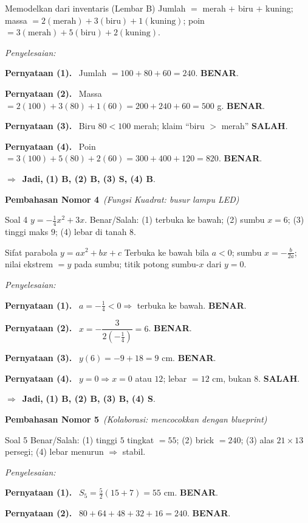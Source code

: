 \documentclass[11pt,a4paper]{article}
\newcommand{\jawab}{\par\smallskip\noindent\textit{\textcolor{oranye}{Penyelesaian:}}\par\smallskip}
\newcommand{\jadi}{\par\smallskip\noindent$\Rightarrow$\ \textbf{Jadi, }}
\newcommand{\benar}{\textbf{\textcolor{hijau}{BENAR}}}
\newcommand{\salah}{\textbf{\textcolor{merah}{SALAH}}}
\newcommand{\pernyataan}[1]{\par\smallskip\noindent\textbf{Pernyataan (#1).}\ }
\newcommand{\nomorjudul}[2]{\par\bigskip\noindent%
  {\large\bfseries\color{ungu}Pembahasan Nomor #1}\ {\normalfont\itshape\color{gray}(#2)}\par\nopagebreak\smallskip}
\begin{document}
\begin{ingat}{Memodelkan dari inventaris (Lembar B)}
Jumlah $=$ merah $+$ biru $+$ kuning; massa $=2(\text{merah})+3(\text{biru})+1(\text{kuning})$;
poin $=3(\text{merah})+5(\text{biru})+2(\text{kuning})$.
\end{ingat}

\jawab
\pernyataan{1} Jumlah $=100+80+60=240$. \benar.

\pernyataan{2} Massa $=2(100)+3(80)+1(60)=200+240+60=500$ g. \benar.

\pernyataan{3} Biru $80<100$ merah; klaim ``biru $>$ merah'' \salah.

\pernyataan{4} Poin $=3(100)+5(80)+2(60)=300+400+120=820$. \benar.

\jadi \textbf{(1) B, (2) B, (3) S, (4) B}.

\nomorjudul{4}{Fungsi Kuadrat: busur lampu LED}
\begin{soalbox}{Soal 4}
$y=-\tfrac14x^2+3x$. Benar/Salah: (1) terbuka ke bawah; (2) sumbu $x=6$;
(3) tinggi maks $9$; (4) lebar di tanah $8$.
\end{soalbox}

\begin{ingat}{Sifat parabola $y=ax^2+bx+c$}
Terbuka ke bawah bila $a<0$; sumbu $x=-\tfrac{b}{2a}$; nilai ekstrem $=y$ pada
sumbu; titik potong sumbu-$x$ dari $y=0$.
\end{ingat}

\jawab
\pernyataan{1} $a=-\tfrac14<0\Rightarrow$ terbuka ke bawah. \benar.

\pernyataan{2} $x=-\dfrac{3}{2(-\frac14)}=6$. \benar.

\pernyataan{3} $y(6)=-9+18=9$ cm. \benar.

\pernyataan{4} $y=0\Rightarrow x=0$ atau $12$; lebar $=12$ cm, bukan $8$. \salah.

\jadi \textbf{(1) B, (2) B, (3) B, (4) S}.

\nomorjudul{5}{Kolaborasi: mencocokkan dengan blueprint}
\begin{soalbox}{Soal 5}
Benar/Salah: (1) tinggi $5$ tingkat $=55$; (2) brick $=240$; (3) alas $21\times13$
persegi; (4) lebar menurun $\Rightarrow$ stabil.
\end{soalbox}

\jawab
\pernyataan{1} $S_5=\tfrac{5}{2}(15+7)=55$ cm. \benar.

\pernyataan{2} $80+64+48+32+16=240$. \benar.
\end{document}

